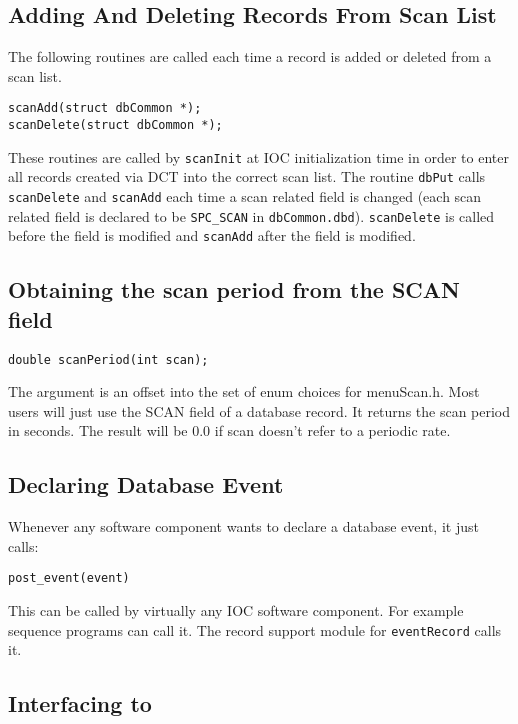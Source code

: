\subsection{Adding And Deleting Records From Scan List}

The following routines are called each time a record is added or deleted from a scan list.

\begin{verbatim}scanAdd(struct dbCommon *);
scanDelete(struct dbCommon *);
\end{verbatim}
These routines are called by \verb|scanInit| at IOC initialization time in order to enter all records created via DCT into the 
correct scan list. The routine \verb|dbPut| calls \verb|scanDelete| and \verb|scanAdd| each time a scan related field is changed (each 
scan related field is declared to be \verb|SPC_SCAN| in  \verb|dbCommon.dbd|). \verb|scanDelete| is called before the field is modified 
and \verb|scanAdd| after the field is modified.

\subsection{Obtaining the scan period from the SCAN field}

\begin{verbatim}double scanPeriod(int scan);
\end{verbatim}The argument is an offset into the set of enum choices for menuScan.h. Most users will just use the SCAN field of a 
database record. It returns the scan period in seconds. The result will be 0.0 if  scan doesn't refer to a periodic rate.

\subsection{Declaring Database Event}

Whenever any software component wants to declare a database event, it just calls:

\begin{verbatim}post_event(event)
\end{verbatim}This can be called by virtually any IOC software component. For example sequence programs can call it. The record 
support module for \verb|eventRecord| calls it.

\subsection{Interfacing to }

